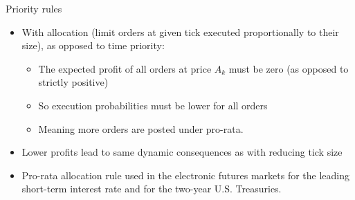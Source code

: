 \documentclass[english,10pt
,aspectratio=169
]{beamer}
\begin{document}
%	
%	
%
%


\begin{frame}{Priority rules}
	\begin{itemize}
		\item With  allocation (limit orders at given tick executed proportionally to their size), as opposed to \alert{time priority}:
		\begin{itemize}
			\item The expected profit of all orders at price $A_k$ must be zero (as opposed to strictly positive)
			\item So execution probabilities must be lower for all orders
			\item Meaning more orders are posted under pro-rata.
		\end{itemize}
		\item Lower profits lead to same dynamic consequences as with reducing tick size
		\item Pro-rata allocation rule used in the electronic futures markets for the leading short-term interest rate and for the two-year U.S. Treasuries.
	\end{itemize}
\end{frame}
\end{document}
